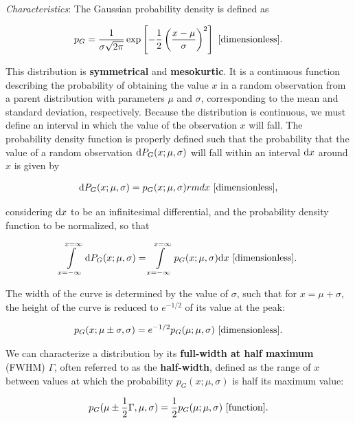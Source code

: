 \documentclass[a4paper,10pt]{article}
\begin{document}
{\noindent}\textit{Characteristics}: The Gaussian probability density is defined as

\begin{align*}
    p_G = \frac{1}{\sigma\sqrt{2\pi}}\exp \left[-\frac{1}{2} \left(\frac{x-\mu}{\sigma}\right)^2 \right] ~ [{\rm dimensionless}].
\end{align*}

{\noindent}This distribution is \textbf{symmetrical} and \textbf{mesokurtic}. It is a continuous function describing the probability of obtaining the value $x$ in a random observation from a parent distribution with parameters $\mu$ and $\sigma$, corresponding to the mean and standard deviation, respectively. Because the distribution is continuous, we must define an interval in which the value of the observation $x$ will fall. The probability density function is properly defined such that the probability that the value of a random observation ${\rm d}P_G(x;\mu,\sigma)$ will fall within an interval ${\rm d}x$ around $x$ is given by

\begin{align*}
    {\rm d}P_G(x;\mu,\sigma) = p_G(x;\mu,\sigma){rm d}x ~ [{\rm dimensionless}],
\end{align*}

{\noindent}considering ${\rm d}x$ to be an infinitesimal differential, and the probability density function to be normalized, so that

\begin{align*}
    \int\limits_{x=-\infty}^{x=\infty} {\rm d}P_G(x;\mu,\sigma) = \int\limits_{x=-\infty}^{x=\infty} p_G(x;\mu,\sigma){\rm d}x ~ [{\rm dimensionless}].
\end{align*}

{\noindent}The width of the curve is determined by the value of $\sigma$, such that for $x=\mu+\sigma$, the height of the curve is reduced to $e^{-1/2}$ of its value at the peak:

\begin{align*}
    p_G(x;\mu\pm\sigma,\sigma) = e^{-1/2}p_G(\mu;\mu,\sigma) ~ [{\rm dimensionless}].
\end{align*}

{\noindent}We can characterize a distribution by its \textbf{full-width at half maximum} (FWHM) $\Gamma$, often referred to as the \textbf{half-width}, defined as the range of $x$ between values at which the probability $p_G(x;\mu,\sigma)$ is half its maximum value:

\begin{align*}
    p_G(\mu\pm\frac{1}{2}\Gamma,\mu,\sigma) = \frac{1}{2}p_G(\mu;\mu,\sigma) ~ [{\rm function}].
\end{align*}
\end{document}
